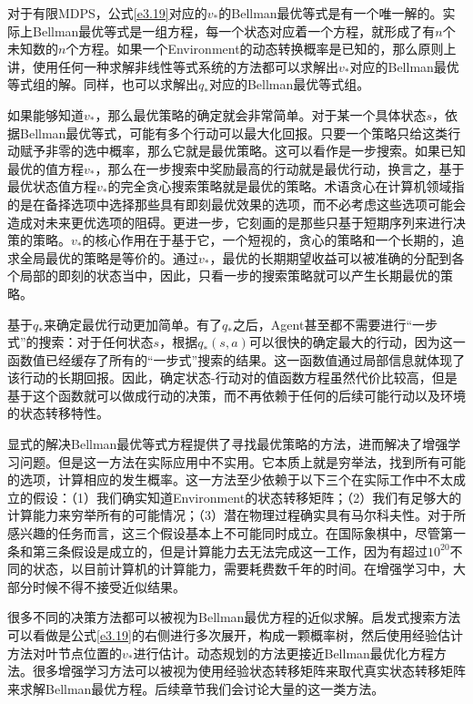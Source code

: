 \documentclass{ctexart}
\begin{document}
            对于有限MDPS，公式\ref{e3.19}对应的$v_*$的Bellman最优等式是有一个唯一解的。实际上Bellman最优等式是一组方程，每一个状态对应着一个方程，就形成了有$n$个未知数的$n$个方程。如果一个Environment的动态转换概率是已知的，那么原则上讲，使用任何一种求解非线性等式系统的方法都可以求解出$v_*$对应的Bellman最优等式组的解。同样，也可以求解出$q_*$对应的Bellman最优等式组。

            如果能够知道$v_*$，那么最优策略的确定就会非常简单。对于某一个具体状态$s$，依据Bellman最优等式，可能有多个行动可以最大化回报。只要一个策略只给这类行动赋予非零的选中概率，那么它就是最优策略。这可以看作是一步搜索。如果已知最优的值方程$v_*$，那么在一步搜索中奖励最高的行动就是最优行动，换言之，基于最优状态值方程$v_*$的完全贪心搜索策略就是最优的策略。术语贪心在计算机领域指的是在备择选项中选择那些具有即刻最优效果的选项，而不必考虑这些选项可能会造成对未来更优选项的阻碍。更进一步，它刻画的是那些只基于短期序列来进行决策的策略。$v_*$的核心作用在于基于它，一个短视的，贪心的策略和一个长期的，追求全局最优的策略是等价的。通过$v_*$，最优的长期期望收益可以被准确的分配到各个局部的即刻的状态当中，因此，只看一步的搜索策略就可以产生长期最优的策略。

            基于$q_*$来确定最优行动更加简单。有了$q_*$之后，Agent甚至都不需要进行“一步式”的搜索：对于任何状态$s$，根据$q_*(s,a)$可以很快的确定最大的行动，因为这一函数值已经缓存了所有的“一步式”搜索的结果。这一函数值通过局部信息就体现了该行动的长期回报。因此，确定状态-行动对的值函数方程虽然代价比较高，但是基于这个函数就可以做成行动的决策，而不再依赖于任何的后续可能行动以及环境的状态转移特性。

            显式的解决Bellman最优等式方程提供了寻找最优策略的方法，进而解决了增强学习问题。但是这一方法在实际应用中不实用。它本质上就是穷举法，找到所有可能的选项，计算相应的发生概率。这一方法至少依赖于以下三个在实际工作中不太成立的假设：（1）我们确实知道Environment的状态转移矩阵；（2）我们有足够大的计算能力来穷举所有的可能情况；（3）潜在物理过程确实具有马尔科夫性。对于所感兴趣的任务而言，这三个假设基本上不可能同时成立。在国际象棋中，尽管第一条和第三条假设是成立的，但是计算能力去无法完成这一工作，因为有超过$10^20$不同的状态，以目前计算机的计算能力，需要耗费数千年的时间。在增强学习中，大部分时候不得不接受近似结果。

            很多不同的决策方法都可以被视为Bellman最优方程的近似求解。启发式搜索方法可以看做是公式\ref{e3.19}的右侧进行多次展开，构成一颗概率树，然后使用经验估计方法对叶节点位置的$v_*$进行估计。动态规划的方法更接近Bellman最优化方程方法。很多增强学习方法可以被视为使用经验状态转移矩阵来取代真实状态转移矩阵来求解Bellman最优方程。后续章节我们会讨论大量的这一类方法。
\end{document}
